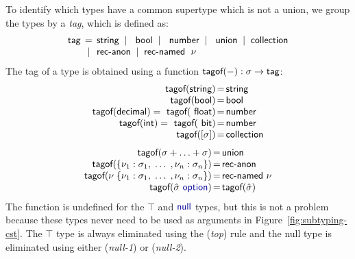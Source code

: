 \documentclass[preprint]{sigplanconf}
\newcommand{\kvd}[1]{\textnormal{\textcolor{kvdclr}{\sffamily #1}}}
\newcommand{\ident}[1]{\textnormal{\sffamily #1}}
\newcommand{\lsep}[0]{\;\; | \;\;}
\newcommand{\narrow}[1]{\hspace{-0.85em} #1 \hspace{-0.85em}}
\newcommand{\tytag}{\ident{tag}}
\newcommand{\tytagof}{\ident{tagof}}
\begin{document}
To identify which types have a common supertype which is not a union, we group the types by a 
\emph{tag}, which is defined as:
%
\begin{equation*}
\begin{array}{rcl}
 \tytag &\narrow{=}&  \ident{string} \lsep \ident{bool} \lsep \ident{number} \lsep \ident{union} \lsep \ident{collection} \\
        &\narrow{\lsep}& \ident{rec-anon} \lsep \ident{rec-named}\;~\nu 
\end{array}
\end{equation*}
%
The tag of a type is obtained using a function $\tytagof{(-)} : \sigma \rightarrow \tytag$:
%
\begin{equation*}
\begin{array}{rcl}
 \tytagof(\ident{string}) &\narrow{=}& \ident{string}\\
 \tytagof(\ident{bool}) &\narrow{=}& \ident{bool}\\
 \tytagof(\ident{decimal}) = \tytagof(\ident{float}) &\narrow{=}& \ident{number}\\
 \tytagof(\ident{int}) = \tytagof(\ident{bit}) &\narrow{=}& \ident{number}\\
 \tytagof([\sigma]) &\narrow{=}& \ident{collection}\\
\end{array}
\end{equation*}
\begin{equation*}
\begin{array}{rcl}
 \tytagof(\sigma + \ldots + \sigma) &\narrow{=}& \ident{union}\\
 \tytagof(\{ \nu_1 : \sigma_1, \; \ldots \; , \nu_n : \sigma_n \}) &\narrow{=}& \ident{rec-anon}\\
 \tytagof(\nu\; \{ \nu_1 : \sigma_1, \; \ldots \; , \nu_n : \sigma_n \}) &\narrow{=}& \ident{rec-named}~\nu \\
 \tytagof(\hat{\sigma}~\kvd{option}) &\narrow{=}& \tytagof(\hat{\sigma})
\end{array}
\end{equation*}
%
The function is undefined for the $\top$ and $\kvd{null}$ types, but this is not a 
problem because these types never need to be used as arguments in Figure~\ref{fig:subtyping-cst}.
The $\top$ type is always eliminated using the (\emph{top}) rule and the \kvd{null} type
is eliminated using either (\emph{null-1}) or (\emph{null-2}).
\end{document}

